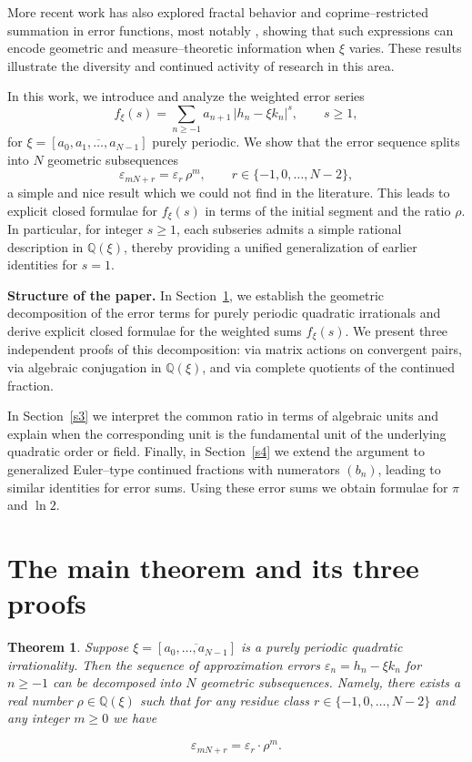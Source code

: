 \documentclass[]{interact}
\theoremstyle{plain}
\numberwithin{equation}{section} %
\newtheorem{theorem}[thm]{Theorem}
\numberwithin{table}{section} %
\numberwithin{figure}{section}
\begin{document}
More recent work has also explored fractal behavior and coprime--restricted
summation in error functions, most notably \cite{ahn2025m},
showing that such expressions can encode geometric and measure--theoretic
information when $\xi$ varies.
These results illustrate the diversity and continued activity of research in
this area.



In this work, we introduce and analyze the weighted error series
\[
   f_\xi(s) = \sum_{n\ge -1} a_{n+1}\,|h_n - \xi k_n|^s,\qquad s\ge1,
\]
for $\xi=[\overline{a_0,a_1,\dots,a_{N-1}}]$ purely periodic.
We show that the error sequence splits into $N$ geometric subsequences
\[
   \varepsilon_{mN+r} = \varepsilon_r\,\rho^m,
\qquad r\in\{-1,0,\dots,N-2\},
\]
a simple and nice result which we could not find in the literature. This leads to explicit closed formulae for $f_\xi(s)$ in terms of the
initial segment and the ratio $\rho$.  
In particular, for integer $s\ge1$, each subseries admits a simple rational
description in $\mathbb Q(\xi)$,
thereby providing a unified generalization of earlier identities for $s=1$.

\textbf{Structure of the paper.}
In Section~\ref{s2}, we establish the geometric decomposition of the 
error terms for purely periodic quadratic irrationals and derive explicit closed 
formulae for the weighted sums $f_\xi(s)$.  We present 
three independent proofs of this decomposition: via matrix actions on convergent 
pairs, via algebraic conjugation in $\mathbb{Q}(\xi)$, and via complete quotients of the 
continued fraction.  


In Section~\ref{s3} we interpret the common ratio in terms
of algebraic units and explain when the corresponding unit is the fundamental
unit of the underlying quadratic order or field.  
Finally, in
Section~\ref{s4} we extend the argument to 
generalized Euler--type continued fractions with numerators $(b_n)$, leading to 
similar identities for error sums.  Using these error sums we obtain
formulae for $\pi$ and $\ln 2$.







\section{The main theorem and its three proofs}\label{s2}






\begin{theorem}\label{th3}
Suppose $\xi = [\overline{a_0, \dots, a_{N-1}}]$ is a purely periodic quadratic irrationality. Then the sequence of approximation errors $\varepsilon_n = h_n - \xi k_n$ for $n \ge -1$ can be decomposed into $N$ geometric subsequences. Namely, there exists a real number $\rho\in\mathbb Q(\xi)$ such that for any residue class $r \in \{-1, 0, \dots, N-2\}$ and any integer $m \ge 0$ we have


$$\varepsilon_{mN+r} = \varepsilon_r \cdot \rho^m.$$
\end{theorem}
\end{document}
